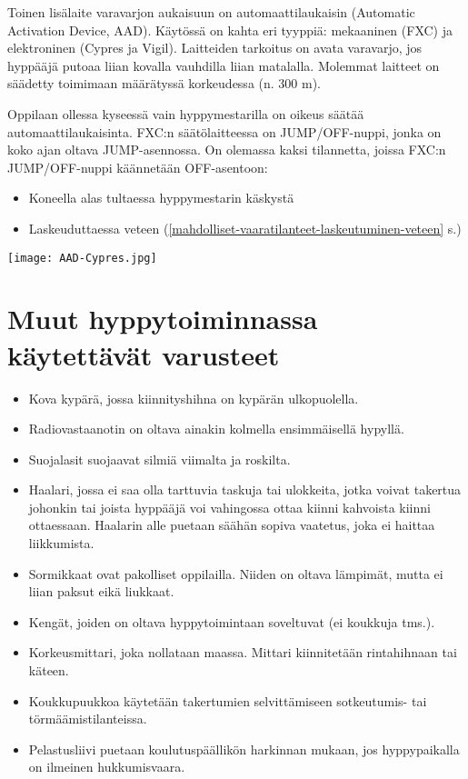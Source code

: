 Toinen lisälaite varavarjon aukaisuun on automaattilaukaisin (Automatic Activation Device, AAD). Käytössä on kahta eri tyyppiä: mekaaninen (FXC) ja elektroninen (Cypres ja Vigil). Laitteiden tarkoitus on avata varavarjo, jos hyppääjä putoaa liian kovalla vauhdilla liian matalalla. Molemmat laitteet on säädetty toimimaan määrätyssä korkeudessa (n. 300 m).  


Oppilaan ollessa kyseessä vain hyppymestarilla on oikeus säätää automaattilaukaisinta. FXC:n säätölaitteessa on JUMP/OFF-nuppi, jonka on koko ajan oltava JUMP-asennossa. On olemassa kaksi tilannetta, joissa FXC:n JUMP/OFF-nuppi käännetään OFF-asentoon: 

\begin{itemize}
\item  Koneella alas tultaessa hyppymestarin käskystä 
\item  Laskeuduttaessa veteen (\ref{mahdolliset-vaaratilanteet-laskeutuminen-veteen} s.\pageref{mahdolliset-vaaratilanteet-laskeutuminen-veteen}) 
\end{itemize}

\begin{Figure}\centering\texttt{[image: AAD-Cypres.jpg]}\end{Figure} 

\section{ Muut hyppytoiminnassa käytettävät varusteet }
\label{laskuvarjokalusto-ja-hyppyvarusteet-muut-hyppytoiminnassa-kaytettavat-varusteet}

\begin{itemize}
\item  Kova kypärä, jossa kiinnityshihna on kypärän ulkopuolella. 
\item  Radiovastaanotin on oltava ainakin kolmella ensimmäisellä hypyllä. 
\item  Suojalasit suojaavat silmiä viimalta ja roskilta. 
\item  Haalari, jossa ei saa olla tarttuvia taskuja tai ulokkeita, jotka voivat takertua johonkin tai joista hyppääjä voi vahingossa ottaa kiinni kahvoista kiinni ottaessaan. Haalarin alle puetaan säähän sopiva vaatetus, joka ei haittaa liikkumista. 
\item  Sormikkaat ovat pakolliset oppilailla. Niiden on oltava lämpimät, mutta ei liian paksut eikä liukkaat. 
\item  Kengät, joiden on oltava hyppytoimintaan soveltuvat (ei koukkuja tms.). 
\item  Korkeusmittari, joka nollataan maassa. Mittari kiinnitetään rintahihnaan tai käteen. 
\item  Koukkupuukkoa käytetään takertumien selvittämiseen sotkeutumis- tai törmäämistilanteissa. 
\item  Pelastusliivi puetaan koulutuspäällikön harkinnan mukaan, jos hyppypaikalla on ilmeinen hukkumisvaara. 
\end{itemize}

